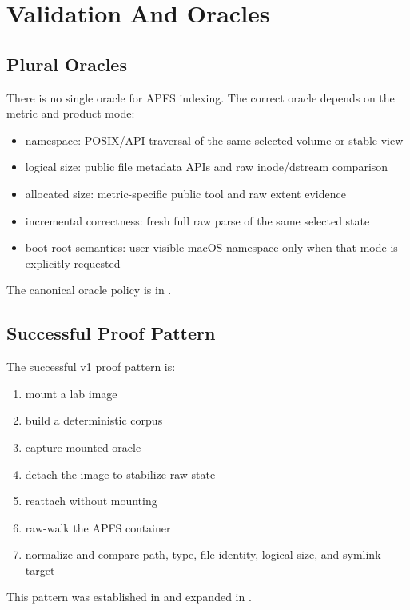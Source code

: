 \chapter{Validation And Oracles}

\section{Plural Oracles}

There is no single oracle for APFS indexing. The correct oracle depends on the
metric and product mode:

\begin{itemize}
  \item namespace: POSIX/API traversal of the same selected volume or stable view
  \item logical size: public file metadata APIs and raw inode/dstream comparison
  \item allocated size: metric-specific public tool and raw extent evidence
  \item incremental correctness: fresh full raw parse of the same selected state
  \item boot-root semantics: user-visible macOS namespace only when that mode is
  explicitly requested
\end{itemize}

The canonical oracle policy is in
.

\section{Successful Proof Pattern}

The successful v1 proof pattern is:

\begin{enumerate}
  \item mount a lab image
  \item build a deterministic corpus
  \item capture mounted oracle
  \item detach the image to stabilize raw state
  \item reattach without mounting
  \item raw-walk the APFS container
  \item normalize and compare path, type, file identity, logical size, and
  symlink target
\end{enumerate}

This pattern was established in 
and expanded in .

